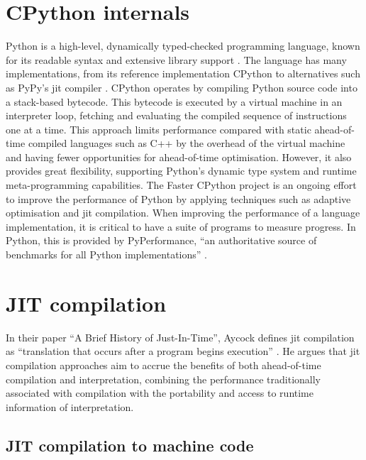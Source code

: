 \section{CPython internals}
\label{sec:python-internals}

Python is a high-level, dynamically typed-checked programming language, known for its readable syntax and extensive library support \cite{guidovanrossumPythonCpython2025}.
The language has many implementations, from its reference implementation CPython to alternatives such as PyPy's \ac{jit} compiler \cite{thepypyteamPypyPypy2025}.
CPython operates by compiling Python source code into a stack-based bytecode. This bytecode is executed by a virtual machine in an interpreter loop, fetching and evaluating the compiled sequence of instructions one at a time. This approach limits performance compared with static ahead-of-time compiled languages such as C++ by the overhead of the virtual machine and having fewer opportunities for ahead-of-time optimisation. However, it also provides great flexibility, supporting Python's dynamic type system and runtime meta-programming capabilities.
The Faster CPython project is an ongoing effort to improve the performance of Python by applying techniques such as adaptive optimisation and \ac{jit} compilation.
When improving the performance of a language implementation, it is critical to have a suite of programs to measure progress. In Python, this is provided by PyPerformance, ``an authoritative source of benchmarks for all Python implementations'' \cite{collinwinterPythonPyperformance2025}.



\section{JIT compilation}
\label{sec:jit-compilation}

In their paper ``A Brief History of Just-In-Time'', Aycock defines \acf{jit} compilation as ``translation that occurs after a program begins execution'' \cite{aycockBriefHistoryJustintime2003}.
He argues that \ac{jit} compilation approaches aim to accrue the benefits of both ahead-of-time compilation and interpretation, combining the performance traditionally associated with compilation with the portability and access to runtime information of interpretation.

\subsection{JIT compilation to machine code}
\label{ssec:jit-compilation-machine-code}

